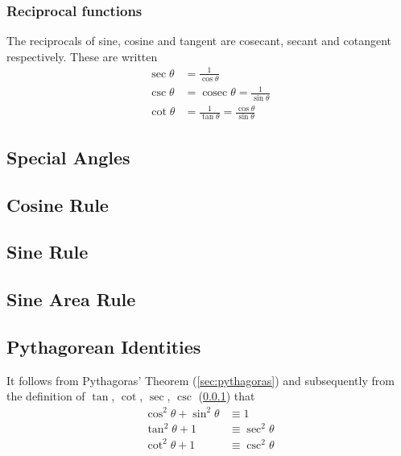 \documentclass[fleqn,a4paper,11pt]{article}
\begin{document}
    \subsubsection{Reciprocal functions} \label{sec:trig_reciprocal}


    The reciprocals of sine, cosine and tangent are cosecant, secant and
    cotangent respectively. These are written
    \begin{align}
    \sec \theta &= \frac{1}{\cos \theta} \\
    \csc \theta &= \operatorname{cosec} \theta
        = \frac{1}{\sin \theta} \\
    \cot \theta &= \frac{1}{\tan \theta}
        = \frac{\cos \theta}{\sin \theta}
    \end{align}

    \subsection{Special Angles}


    \subsection{Cosine Rule}

    \subsection{Sine Rule}

    \subsection{Sine Area Rule}

    \subsection{Pythagorean Identities} \label{sec:trig_pythag}

    It follows from Pythagoras' Theorem (\ref{sec:pythagoras})
    and subsequently from the definition of
    \(\tan\), \(\cot\), \(\sec\), \(\csc\) (\ref{sec:trig_reciprocal}) that
    \begin{align}
    \cos^2 \theta + \sin^2 \theta &\equiv 1 \\
    \tan^2 \theta + 1 &\equiv \sec^2 \theta \\
    \cot^2 \theta + 1 &\equiv \csc^2 \theta
    \end{align}
\end{document}
